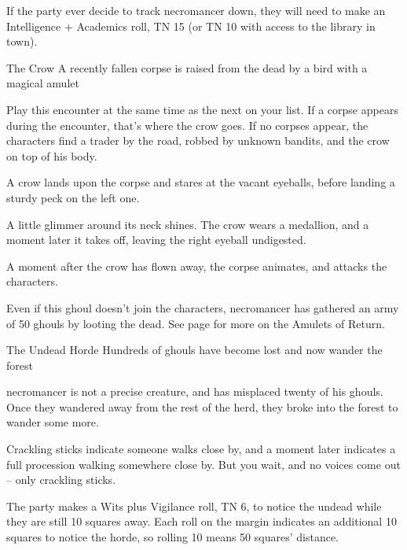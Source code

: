 \begin{multicols}{2}
If the party ever decide to track \gls{necromancer} down, they will need to make an Intelligence + Academics roll, TN 15 (or TN 10 with access to the library in town).

{The Crow}%
{A recently fallen corpse is raised from the dead by a bird with a magical amulet}%

Play this encounter at the same time as the next on your list.
If a corpse appears during the encounter, that's where the crow goes.
If no corpses appear, the characters find a trader by the road, robbed by unknown bandits, and the crow on top of his body.

\begin{boxtext}
	A crow lands upon the corpse and stares at the vacant eyeballs, before landing a sturdy peck on the left one.

	A little glimmer around its neck shines.  The crow wears a medallion, and a moment later it takes off, leaving the right eyeball undigested.

\end{boxtext}

A moment after the crow has flown away, the corpse animates, and attacks the characters.


Even if this ghoul doesn't join the characters, \gls{necromancer} has gathered an army of 50 ghouls by looting the dead.
See page \pageref{ghoulNecklace} for more on the Amulets of Return.

{The Undead Horde}%
{Hundreds of ghouls have become lost and now wander the forest}%

\Gls{necromancer} is not a precise creature, and has misplaced twenty of his ghouls.
Once they wandered away from the rest of the herd, they broke into the forest to wander some more.

\begin{boxtext}

	Crackling sticks indicate someone walks close by, and a moment later indicates a full procession walking somewhere close by.
	But you wait, and no voices come out -- only crackling sticks.

\end{boxtext}

The party makes a Wits plus Vigilance roll, TN 6, to notice the undead while they are still 10 squares away.
Each roll on the margin indicates an additional 10 squares to notice the horde, so rolling 10 means 50 squares' distance.


\end{multicols}
